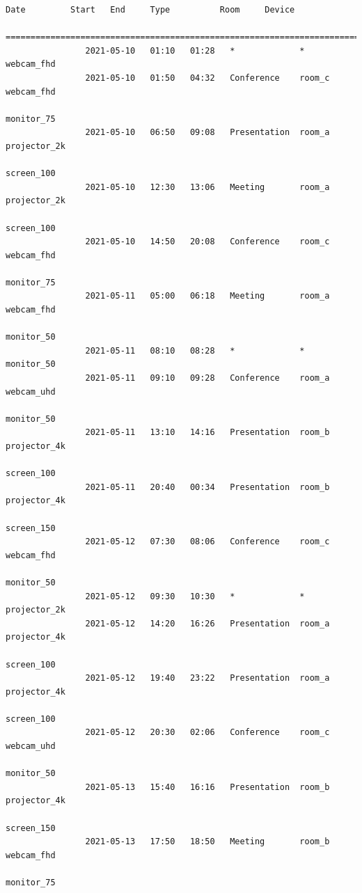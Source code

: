 \documentclass{article}
\begin{document}
\begin{Verbatim}[gobble=8]
                Date         Start   End     Type          Room     Device
                ===========================================================================
                2021-05-10   01:10   01:28   *             *        webcam_fhd
                2021-05-10   01:50   04:32   Conference    room_c   webcam_fhd
                                                                    monitor_75
                2021-05-10   06:50   09:08   Presentation  room_a   projector_2k
                                                                    screen_100
                2021-05-10   12:30   13:06   Meeting       room_a   projector_2k
                                                                    screen_100
                2021-05-10   14:50   20:08   Conference    room_c   webcam_fhd
                                                                    monitor_75
                2021-05-11   05:00   06:18   Meeting       room_a   webcam_fhd
                                                                    monitor_50
                2021-05-11   08:10   08:28   *             *        monitor_50
                2021-05-11   09:10   09:28   Conference    room_a   webcam_uhd
                                                                    monitor_50
                2021-05-11   13:10   14:16   Presentation  room_b   projector_4k
                                                                    screen_100
                2021-05-11   20:40   00:34   Presentation  room_b   projector_4k
                                                                    screen_150
                2021-05-12   07:30   08:06   Conference    room_c   webcam_fhd
                                                                    monitor_50
                2021-05-12   09:30   10:30   *             *        projector_2k
                2021-05-12   14:20   16:26   Presentation  room_a   projector_4k
                                                                    screen_100
                2021-05-12   19:40   23:22   Presentation  room_a   projector_4k
                                                                    screen_100
                2021-05-12   20:30   02:06   Conference    room_c   webcam_uhd
                                                                    monitor_50
                2021-05-13   15:40   16:16   Presentation  room_b   projector_4k
                                                                    screen_150
                2021-05-13   17:50   18:50   Meeting       room_b   webcam_fhd
                                                                    monitor_75

\end{Verbatim}
\end{document}
